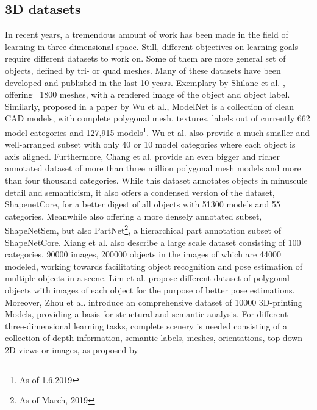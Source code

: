   \subsection{3D datasets}
  \label{3ddatasets} 
  In recent years, a tremendous amount of work has been made in the field of learning in three-dimensional space.
  Still, different objectives on learning goals require different datasets to work on. Some of them are more general 
  set of objects, defined by tri- or quad meshes. Many of these datasets have been developed and published in the last 10 years.
   Exemplary by Shilane et al. \cite{Shilane:2004:TPS}, offering ~1800 meshes, with a rendered image of the object and object label. 
   Similarly, proposed in a paper by Wu et al.\cite{7298801}, ModelNet is a collection of
    clean CAD models, with complete polygonal mesh, textures, labels out of currently 662 model categories and 127,915 models\footnote{As of 1.6.2019}.
    Wu et al. also provide a much smaller and well-arranged subset with only 40 or 10 model categories where each object is axis aligned. 
    Furthermore, Chang et al. \cite{shapenet2015} provide an even bigger and richer annotated dataset of more than three million polygonal 
    mesh models and more than four thousand categories. While this dataset annotates objects in minuscule detail and semanticism, it also 
    offers a condensed version of the dataset, ShapenetCore, for a better digest of all objects with 51300 models and 55 categories. Meanwhile also offering a more 
    densely annotated subset, ShapeNetSem, but also PartNet\footnote{As of March, 2019}, a hierarchical part annotation subset of ShapeNetCore.
    Xiang et al. \cite{xiang2016objectnet3d} also describe a large scale dataset consisting of 100 categories, 90000 images, 200000 objects in the
     images of which are  44000 modeled, working towards facilitating object recognition and pose estimation of multiple objects in a scene. 
Lim et al. \cite{lpt2013ikea} propose different dataset of polygonal objects with images of each object for the purpose of better pose estimations.
Moreover, Zhou et al. \cite{Thingi10K} introduce an comprehensive dataset of 10000 3D-printing Models, 
providing a basis for structural and semantic analysis.
For different three-dimensional learning tasks, complete scenery is needed 
consisting of a collection of depth information, semantic labels, meshes,
 orientations, top-down 2D views or images, as proposed by \cite{Silberman:ECCV12,sunrgb,objectnn-shrec17,dai2017scannet}%
